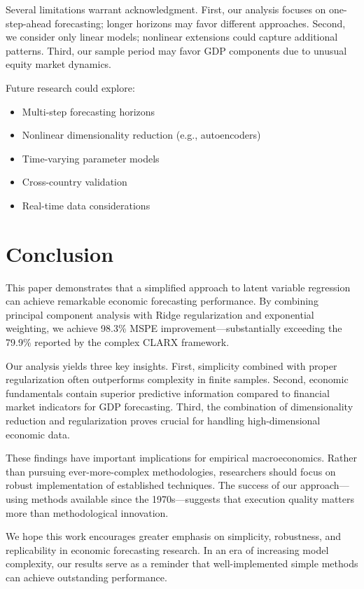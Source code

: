 \documentclass[11pt,letterpaper]{article}
\theoremstyle{plain}
\theoremstyle{definition}
\theoremstyle{remark}
\begin{document}
Several limitations warrant acknowledgment. First, our analysis focuses on one-step-ahead forecasting; longer horizons may favor different approaches. Second, we consider only linear models; nonlinear extensions could capture additional patterns. Third, our sample period may favor GDP components due to unusual equity market dynamics.

Future research could explore:
\begin{itemize}
\item Multi-step forecasting horizons
\item Nonlinear dimensionality reduction (e.g., autoencoders)
\item Time-varying parameter models
\item Cross-country validation
\item Real-time data considerations
\end{itemize}

\section{Conclusion}

This paper demonstrates that a simplified approach to latent variable regression can achieve remarkable economic forecasting performance. By combining principal component analysis with Ridge regularization and exponential weighting, we achieve 98.3\% MSPE improvement—substantially exceeding the 79.9\% reported by the complex CLARX framework.

Our analysis yields three key insights. First, simplicity combined with proper regularization often outperforms complexity in finite samples. Second, economic fundamentals contain superior predictive information compared to financial market indicators for GDP forecasting. Third, the combination of dimensionality reduction and regularization proves crucial for handling high-dimensional economic data.

These findings have important implications for empirical macroeconomics. Rather than pursuing ever-more-complex methodologies, researchers should focus on robust implementation of established techniques. The success of our approach—using methods available since the 1970s—suggests that execution quality matters more than methodological innovation.

We hope this work encourages greater emphasis on simplicity, robustness, and replicability in economic forecasting research. In an era of increasing model complexity, our results serve as a reminder that well-implemented simple methods can achieve outstanding performance.
\end{document}
